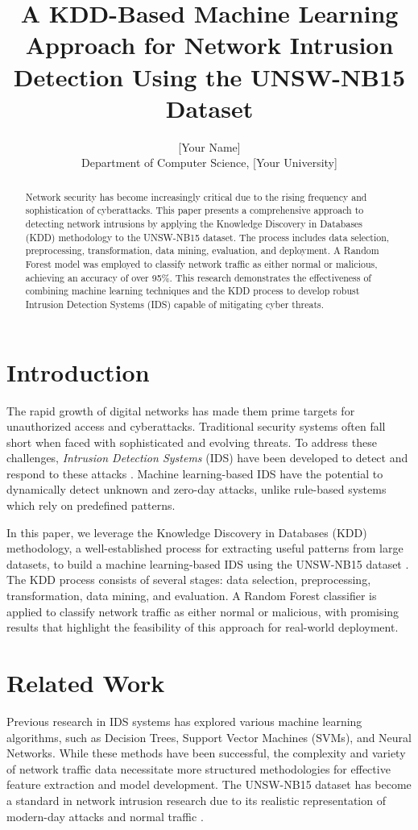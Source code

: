 \documentclass[12pt]{article}
\title{A KDD-Based Machine Learning Approach for Network Intrusion Detection Using the UNSW-NB15 Dataset}
\author{[Your Name]\\
Department of Computer Science, [Your University]\\
[Your University Email]}
\date{}
\begin{document}
\maketitle

\begin{abstract}
Network security has become increasingly critical due to the rising frequency and sophistication of cyberattacks. This paper presents a comprehensive approach to detecting network intrusions by applying the Knowledge Discovery in Databases (KDD) methodology to the UNSW-NB15 dataset. The process includes data selection, preprocessing, transformation, data mining, evaluation, and deployment. A Random Forest model was employed to classify network traffic as either normal or malicious, achieving an accuracy of over 95\%. This research demonstrates the effectiveness of combining machine learning techniques and the KDD process to develop robust Intrusion Detection Systems (IDS) capable of mitigating cyber threats.
\end{abstract}

\section{Introduction}

The rapid growth of digital networks has made them prime targets for unauthorized access and cyberattacks. Traditional security systems often fall short when faced with sophisticated and evolving threats. To address these challenges, \textit{Intrusion Detection Systems} (IDS) have been developed to detect and respond to these attacks \cite{sun2004security}. Machine learning-based IDS have the potential to dynamically detect unknown and zero-day attacks, unlike rule-based systems which rely on predefined patterns.

In this paper, we leverage the Knowledge Discovery in Databases (KDD) methodology, a well-established process for extracting useful patterns from large datasets, to build a machine learning-based IDS using the UNSW-NB15 dataset \cite{moustafa2015unsw}. The KDD process consists of several stages: data selection, preprocessing, transformation, data mining, and evaluation. A Random Forest classifier is applied to classify network traffic as either normal or malicious, with promising results that highlight the feasibility of this approach for real-world deployment.

\section{Related Work}
Previous research in IDS systems has explored various machine learning algorithms, such as Decision Trees, Support Vector Machines (SVMs), and Neural Networks. While these methods have been successful, the complexity and variety of network traffic data necessitate more structured methodologies for effective feature extraction and model development. The UNSW-NB15 dataset has become a standard in network intrusion research due to its realistic representation of modern-day attacks and normal traffic \cite{moustafa2015unsw}. 
\end{document}
